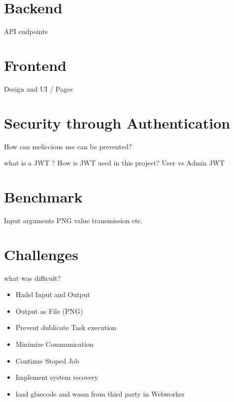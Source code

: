 \section{Backend}
\label{sec:implementation:backend}
API endpoints 

\section{Frontend}
\label{sec:implementation:frontend}
Design and UI / Pages

\section{Security through Authentication}
\label{sec:implementation:authentication}
How can meliccious use can be prevented?

what is a JWT ? How is JWT used in this project? User vs Admin JWT

\section{Benchmark}
\label{sec:implementation:benchamrk}
Input arguments PNG value transmission etc.

\section{Challenges}
\label{sec:implementation:challenges}
what was difficult?
\begin{itemize}
    \item Hadel Input and Output
    \item Output as File (PNG)
    \item Prevent dublicate Task execution
    \item Minimize Communication
    \item Continue Stoped Job
    \item Implement system recovery
    \item load gluecode and wasm from third party in Webworker
\end{itemize}
